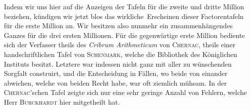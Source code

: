 Indem wir uns hier auf die Anzeigen der Tafeln für die zweite und dritte Million beziehen, kündigen wir jetzt blos das wirkliche\textperiodcentered\ Erscheinen dieser Factorentafeln für die erste Million an. Wir besitzen also nunmehr ein zusammenhängendes Ganzes für die drei ersten Millionen. Für die gegenwärtige erste Million bediente sich der Verfasser theils des \emph{Cribrum Arithmeticum} von \textsc{Chernac}, theils einer handschriftlichen Tafel von \textsc{Schenmark}, welche die Bibliothek des Königlichen Instituts besitzt. Letztere war indessen nicht ganz mit aller zu wünschenden Sorgfalt construirt, und die Entscheidung in Fällen, wo beide von einander abwichen, welche von beiden Recht habe, war oft ziemlich mühsam. In der \textsc{Chernac}'schen Tafel zeigte sich nur eine sehr geringe Anzahl von Fehlern, welche Herr \textsc{Burckhardt} hier mitgetheilt hat.

